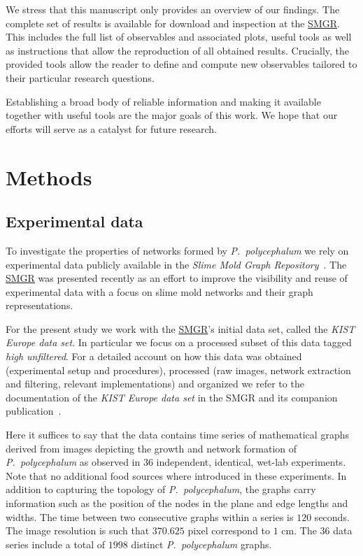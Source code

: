 	We stress that this manuscript only provides an overview of our findings. The complete set of results is available for download and inspection at the \href{http://smgr.mpi-inf.mpg.de}{SMGR}. This includes the full list of observables and associated plots, useful tools as well as instructions that allow the reproduction of all obtained results. Crucially, the provided tools allow the reader to define and compute new observables tailored to their particular research questions.

	Establishing a broad body of reliable information and making it available together with useful tools are the major goals of this work. We hope that our efforts will serve as a catalyst for future research.

\section{Methods}	%

	\subsection{Experimental data}

		To investigate the properties of networks formed by \emph{P.~polycephalum} we rely on experimental data publicly available in the \emph{Slime Mold Graph Repository}~\cite{SMGR}. The \href{http://smgr.mpi-inf.mpg.de}{SMGR} was presented recently as an effort to improve the visibility and reuse of experimental data with a focus on slime mold networks and their graph representations.
	
		For the present study we work with the \href{http://smgr.mpi-inf.mpg.de}{SMGR}'s initial data set, called the \emph{KIST Europe data set}. In particular we focus on a processed subset of this data tagged \emph{high unfiltered}. For a detailed account on how this data was obtained (experimental setup and procedures), processed (raw images, network extraction and filtering, relevant implementations) and organized we refer to the documentation of the \emph{KIST Europe data set} in the SMGR and its companion publication~\cite{SMGR}. 

		Here it suffices to say that the data contains time series of mathematical graphs derived from images depicting the growth and network formation of \emph{P.~polycephalum} as observed in $36$ independent, identical, wet-lab experiments. Note that no additional food sources where introduced in these experiments. In addition to capturing the topology of \emph{P.~polycephalum}, the graphs carry information such as the position of the nodes in the plane and edge lengths and widths. The time between two consecutive graphs within a series is $120$ seconds. The image resolution is such that $370.625$ pixel correspond to $1$ cm. The $36$ data series include a total of $1998$ distinct \emph{P.~polycephalum} graphs. 

